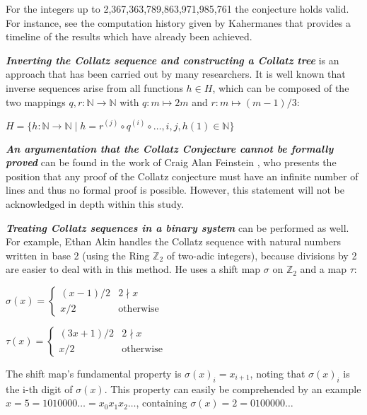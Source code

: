 For the integers up to 2,367,363,789,863,971,985,761 the conjecture holds valid. For instance, see the computation history given by Kahermanes \cite{Ref_Kahermanes_2011} that provides a timeline of the results which have already been achieved.

\par\medskip
\textit{\textbf{Inverting the Collatz sequence and constructing a Collatz tree}} is an approach that has been carried out by many researchers. It is well known that inverse sequences \cite{Ref_Klisse_2010} arise from all functions $h\in H$, which can be composed of the two mappings $q,r:\mathbb{N}\rightarrow\mathbb{N}$ with $q:m\mapsto2m$ and $r:m\mapsto(m-1)/3$:
\begin{center}
$H=\{h:\mathbb{N}\rightarrow
\mathbb{N}\mid h=r^{(j)}\circ q^{(i)}\circ\ldots,i,j,h(1)\in\mathbb{N}\}$
\end{center}

\par\medskip
\textit{\textbf{An argumentation that the Collatz Conjecture cannot be formally proved}} can be found in the work of Craig Alan Feinstein \cite{Ref_Feinstein_2012}, who presents the position that any proof of the Collatz conjecture must have an infinite number of lines and thus no formal proof is possible. However, this statement will not be acknowledged in depth within this study.

\par\medskip
\textit{\textbf{Treating Collatz sequences in a binary system}} can be performed as well. For example, Ethan Akin \cite{Ref_Akin_2004} handles the Collatz sequence with natural numbers written in base 2 (using the Ring $\mathbb{Z}_2$ of two-adic integers), because divisions by 2 are easier to deal with in this method. He uses a shift map $\sigma$ on $\mathbb{Z}_2$ and a map $\tau$:

\begin{table}[H]
	\centering
	\parbox{.45\linewidth}{
		$\sigma(x)=
		\begin{cases}
		(x-1)/2		&	2\nmid x\\
		x/2			&	\text{otherwise}
		\end{cases}$
	}
	\parbox[][][b]{.45\linewidth}{
		$\tau(x)=
		\begin{cases}
		(3x+1)/2	&	2\nmid x\\
		x/2			&	\text{otherwise}
		\end{cases}$
	}
\end{table}

The shift map's fundamental property is $\sigma(x)_i=x_{i+1}$, noting that $\sigma(x)_i$ is the i-th digit of $\sigma(x)$. This property can easily be comprehended by an example $x=5=1010000\ldots=x_0x_1x_2\ldots$, containing $\sigma(x)=2=0100000\ldots$

